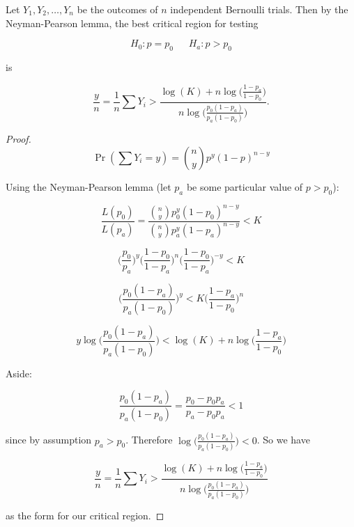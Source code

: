 


%
%
%
%
%
%
%



\begin{proposition} Let \(Y_1, Y_2, \ldots, Y_n\) be the outcomes of \(n\) independent Bernoulli trials. Then by the Neyman-Pearson lemma, the best critical region for testing

\[
H_0: p = p_0 \ \ \ \ \ \ \ H_a: p > p_0
\]

is

\[
\frac{y}{n} = \frac{1}{n}\sum Y_i  > \frac{\log(K) + n \log \bigg( \frac{1 - p_a}{1 - p_0} \bigg)}{n\log \bigg( \frac{p_0(1 - p_a)}{p_a(1 - p_0)} \bigg)}.
\]

\end{proposition}

\begin{proof}

\[
\Pr(\sum Y_i = y) = {n \choose y}p^y(1-p)^{n-y}
\]

Using the Neyman-Pearson lemma (let \(p_a\) be some particular value of \(p > p_0\)):

\[
\frac{L(p_0)}{L(p_a)} = \frac{{n \choose y}p_0^y(1-p_0)^{n-y}}{{n \choose y}p_a^y(1-p_a)^{n-y}} < K
\]

\[
\bigg( \frac{p_0}{p_a} \bigg) ^y   \bigg( \frac{1 - p_0}{1 - p_a} \bigg)^{n} \bigg( \frac{1 - p_0}{1 - p_a} \bigg)^{-y}  < K
\]

\[
\bigg( \frac{p_0(1 - p_a)}{p_a(1 - p_0)} \bigg) ^y  < K  \bigg( \frac{1 - p_a}{1 - p_0} \bigg)^{n} 
\]

\[
y \log \bigg( \frac{p_0(1 - p_a)}{p_a(1 - p_0)} \bigg) < \log(K) + n \log \bigg( \frac{1 - p_a}{1 - p_0} \bigg)
\]

Aside:

\[
\frac{p_0(1 - p_a)}{p_a(1 - p_0)} = \frac{p_0 - p_0 p_a}{p_a - p_0 p_a} < 1
\]

since by assumption \(p_a > p_0\). Therefore \( \log \bigg( \frac{p_0(1 - p_a)}{p_a(1 - p_0)} \bigg) < 0 \). So we have

\[
\frac{y}{n} = \frac{1}{n}\sum Y_i  > \frac{\log(K) + n \log \bigg( \frac{1 - p_a}{1 - p_0} \bigg)}{n\log \bigg( \frac{p_0(1 - p_a)}{p_a(1 - p_0)} \bigg)}
\]

as the form for our critical region.

\end{proof}




%
%
%







